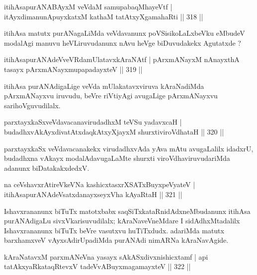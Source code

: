 
\begin{shl}
itihAsapurANABAyxM veVdaM samupabaqMhayeVtf |
itAyxdimanunA\s puyxkatxM kathaM tatAtxyXgamahaRti \hfill || 318 ||
\end{shl}

\begin{artha}
itihAsa matutx purANagaLiMda veVdavanunx poVSisikoLaLxbeVku eMbudeV modalAgi manuvu heVLiruvudanunx nAvu heVge biDuvudakekx Agutatxde ?
\end{artha}

\begin{shl}
itihAsapurANAdeVveVRdamUlatavxkAraNAtf |
pArxmANayxM nAnayxthA tasayx pArxmANayxmupapadayxteV \hfill || 319 ||
\end{shl}

\begin{artha}
itihAsa purANAdigaLige veVda mUlakatavxviruva kAraNadiMda pArxmANayxvu iruvudu, beVre riVtiyAgi avugaLige pArxmANayxvu sarihoVguvudilalx.
\end{artha}

\begin{shl}
parxtayxkaSxveVdavacanavirudadhxM teVSu yadavxcaH |
budadhxvAkAyxdivatAtxdaqkAtxyXjayxM shurxtiviroVdhataH \hfill || 320 ||
\end{shl}

\begin{artha}
parxtayxkaSx veVdavacanakekx virudadhxvAda yAva mAtu avugaLalilx idadxrU, budadhxna vAkayx modalAdavugaLaMte shurxti viroVdhaviruvudariMda adanunx biDatakakxdedxV.
\end{artha}

\begin{shl}
na ceVshavxrAtireVkeVNa kashicxtasxrXSATx\s BuyxpeVyateV |
itihAsapurANAdeVsatxdanayxseyxVha kAyaRtaH \hfill || 321 ||
\end{shl}

\begin{artha}
Ishavxrananunx biTuTx matotxbabx saqSiTxkataRnidAdxneMbudanunx itihAsa purANAdi\-gaLu sivxVkarisuvudilalx; kAraNaveVneMdare I sidAdhxMtadalilx Ishavxrananunx biTuTx beVre vasutxvu huTiTxdudx. adariMda matutx barxhamxveV vAyxsAdirUpadiMda purANAdi nimARNa kAraNavAgide.
\end{artha}

\begin{shl}
kAraNatavxM parxmANeVna yasayx sAkASxdivxnishicxtamf |
api tatAkxyaRkataqRtevxV tadeVvABuyxmagamayxteV \hfill || 322 ||
\end{shl}

